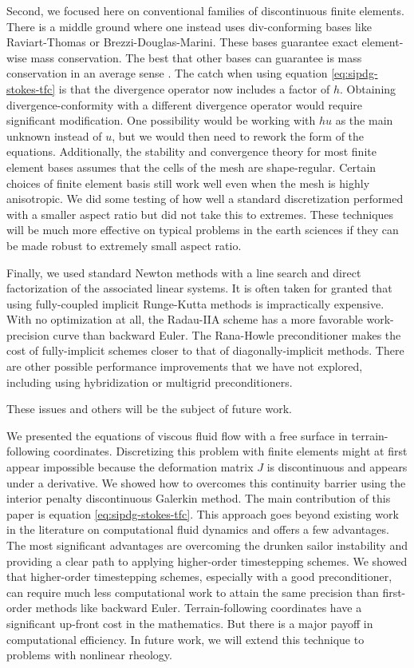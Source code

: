 \documentclass[gmd, manuscript]{copernicus}
\begin{document}
Second, we focused here on conventional families of discontinuous finite elements.
There is a middle ground where one instead uses div-conforming bases like Raviart-Thomas or Brezzi-Douglas-Marini.
These bases guarantee exact element-wise mass conservation.
The best that other bases can guarantee is mass conservation in an average sense \citep{cockburn2007note}.
The catch when using equation \eqref{eq:sipdg-stokes-tfc} is that the divergence operator now includes a factor of $h$.
Obtaining divergence-conformity with a different divergence operator would require significant modification.
One possibility would be working with $hu$ as the main unknown instead of $u$, but we would then need to rework the form of the equations.
Additionally, the stability and convergence theory for most finite element bases assumes that the cells of the mesh are shape-regular.
Certain choices of finite element basis still work well even when the mesh is highly anisotropic.
We did some testing of how well a standard discretization performed with a smaller aspect ratio but did not take this to extremes.
These techniques will be much more effective on typical problems in the earth sciences if they can be made robust to extremely small aspect ratio.

Finally, we used standard Newton methods with a line search and direct factorization of the associated linear systems.
It is often taken for granted that using fully-coupled implicit Runge-Kutta methods is impractically expensive.
With no optimization at all, the Radau-IIA scheme has a more favorable work-precision curve than backward Euler.
The Rana-Howle preconditioner makes the cost of fully-implicit schemes closer to that of diagonally-implicit methods.
There are other possible performance improvements that we have not explored, including using hybridization or multigrid preconditioners.

These issues and others will be the subject of future work.

\conclusions

We presented the equations of viscous fluid flow with a free surface in terrain-following coordinates.
Discretizing this problem with finite elements might at first appear impossible because the deformation matrix $J$ is discontinuous and appears under a derivative.
We showed how to overcomes this continuity barrier using the interior penalty discontinuous Galerkin method.
The main contribution of this paper is equation \eqref{eq:sipdg-stokes-tfc}.
This approach goes beyond existing work in the literature on computational fluid dynamics and offers a few advantages.
The most significant advantages are overcoming the drunken sailor instability and providing a clear path to applying higher-order timestepping schemes.
We showed that higher-order timestepping schemes, especially with a good preconditioner, can require much less computational work to attain the same precision than first-order methods like backward Euler.
Terrain-following coordinates have a significant up-front cost in the mathematics.
But there is a major payoff in computational efficiency.
In future work, we will extend this technique to problems with nonlinear rheology.
\end{document}
